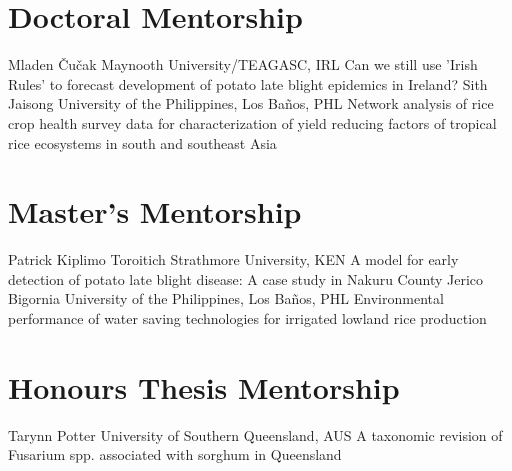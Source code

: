 \section*{Doctoral Mentorship}
\begin{entrylist}
    {Mladen \v{C}u\v{c}ak {}}
    {Maynooth University/TEAGASC, IRL}
    {Can we still use 'Irish Rules' to forecast development of potato late blight epidemics in Ireland?}
    {Sith Jaisong {}}
    {University of the Philippines, Los Ba\~nos, PHL}
    {Network analysis of rice crop health survey data for characterization of yield reducing factors of tropical rice ecosystems in south and southeast Asia}
\end{entrylist}

\section*{Master's Mentorship}
\begin{entrylist}
    {Patrick Kiplimo Toroitich {}}
    {Strathmore University, KEN}
    {A model for early detection of potato late blight disease: A case study in Nakuru County}
    {Jerico Bigornia {}}
    {University of the Philippines, Los Ba\~nos, PHL}
    {Environmental performance of water saving technologies for irrigated lowland rice production}
\end{entrylist}

\section*{Honours Thesis Mentorship}
\begin{entrylist}
    {Tarynn Potter {}}
    {University of Southern Queensland, AUS}
    {A taxonomic revision of Fusarium spp. associated with sorghum in Queensland}
\end{entrylist}
